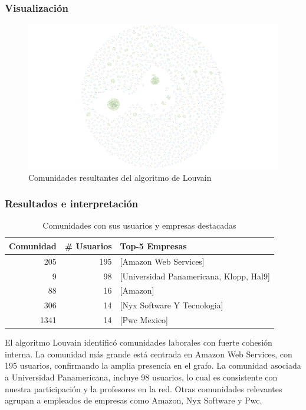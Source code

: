 \documentclass[10pt]{article}
\begin{document}
\subsubsection*{Visualización}
\begin{figure}[H]
	\centering
	\includegraphics[width=1.1\textwidth]{images/communities.png}
	\caption{Comunidades resultantes del algoritmo de Louvain}
\end{figure}
\newpage
\subsubsection*{Resultados e interpretación}
\begin{table}[ht]
	\centering
	\begin{tabular}{|r|r|l|}
		\hline
		\textbf{Comunidad} & \textbf{\# Usuarios} & \textbf{Top-5 Empresas}                 \\
		\hline
		205                & 195                  & [Amazon Web Services]                   \\
		9                  & 98                   & [Universidad Panamericana, Klopp, Hal9] \\
		88                 & 16                   & [Amazon]                                \\
		306                & 14                   & [Nyx Software Y Tecnologia]             \\
		1341               & 14                   & [Pwc Mexico]                            \\
		\hline
	\end{tabular}
	\caption{Comunidades con sus usuarios y empresas destacadas}
\end{table}
El algoritmo Louvain identificó comunidades laborales con fuerte cohesión interna. La comunidad más grande está centrada en Amazon Web Services, con 195 usuarios, confirmando la amplia presencia en el grafo. La comunidad asociada a Universidad Panamericana, incluye 98 usuarios, lo cual es consistente con nuestra participación y la profesores en la red. Otras comunidades relevantes agrupan a empleados de empresas como Amazon, Nyx Software y Pwc.
\end{document}

